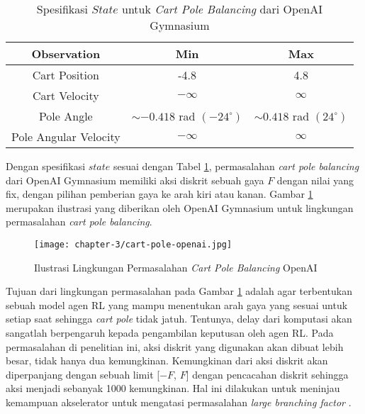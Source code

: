 \begin{table}[h!]
	\caption{Spesifikasi $State$ untuk \textit{Cart Pole Balancing} dari OpenAI Gymnasium}
	\label{tab:state-space-cart-pole}
	\centering
	\begin{tabular}{|c|c|c|}
		\hline
		Observation           & Min                             & Max                           \\
		\hline
		Cart Position         & -4.8                            & 4.8                           \\
		\hline
		Cart Velocity         & $-\infty$                       & $\infty$                      \\
		\hline
		Pole Angle            & $\sim -0.418$ rad $(-24^\circ)$ & $\sim 0.418$ rad $(24^\circ)$ \\
		\hline
		Pole Angular Velocity & $-\infty$                       & $\infty$                      \\
		\hline
	\end{tabular}
\end{table}

Dengan spesifikasi $state$ sesuai dengan Tabel \ref{tab:state-space-cart-pole}, permasalahan \textit{cart pole balancing} dari OpenAI Gymnasium memiliki aksi diskrit sebuah gaya $F$ dengan nilai yang fix, dengan pilihan pemberian gaya ke arah kiri atau kanan. Gambar \ref{fig:cartpole-openai} merupakan ilustrasi yang diberikan oleh OpenAI Gymnasium untuk lingkungan permasalahan \textit{cart pole balancing}.

\begin{figure}[h]
	\centering
	\texttt{[image: chapter-3/cart-pole-openai.jpg]}
	\caption{Ilustrasi Lingkungan Permasalahan \textit{Cart Pole Balancing} OpenAI}
	\label{fig:cartpole-openai}
\end{figure}

Tujuan dari lingkungan permasalahan pada Gambar \ref{fig:cartpole-openai} adalah agar terbentukan sebuah model agen \ac{RL} yang mampu menentukan arah gaya yang sesuai untuk setiap saat sehingga \textit{cart pole} tidak jatuh. Tentunya, delay dari komputasi akan sangatlah berpengaruh kepada pengambilan keputusan oleh agen \ac{RL}. Pada permasalahan di penelitian ini, aksi diskrit yang digunakan akan dibuat lebih besar, tidak hanya dua kemungkinan. Kemungkinan dari aksi diskrit akan diperpanjang dengan sebuah limit [$-F$, $F$] dengan pencacahan diskrit sehingga aksi menjadi sebanyak 1000 kemungkinan. Hal ini dilakukan untuk meninjau kemampuan akselerator untuk mengatasi permasalahan \textit{large branching factor} \parencite{amado2018qtable}.
